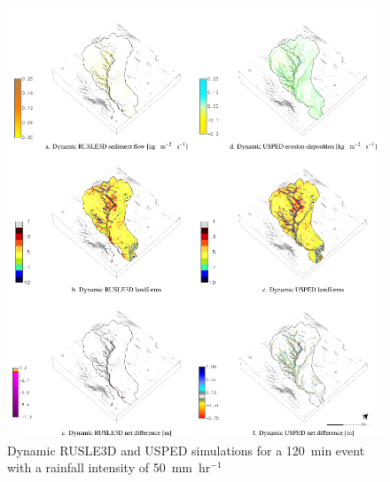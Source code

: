 \documentclass[gmd, manuscript]{copernicus}
\begin{document}
\begin{figure}%
\center
\includegraphics[width=\textwidth,height=0.925\textheight,keepaspectratio]{figures/simulations.pdf}
\caption{Dynamic RUSLE3D and USPED simulations
for a 120~\unit{min} event with a rainfall intensity of 50~\unit{mm~hr}$^{-1}$}
\label{fig:simulations}
\end{figure}
\end{document}
